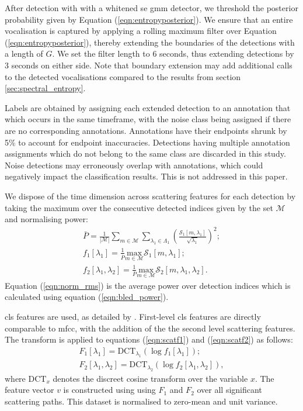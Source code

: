 {After detection with with a whitened \ac{se} \ac{gmm} detector, we threshold the posterior probability given by Equation (\ref{eqn:entropyposterior}). We ensure that an entire vocalisation is captured by applying a rolling maximum filter over Equation (\ref{eqn:entropyposterior}), thereby extending the boundaries of the detections with a length of $G$. We set the filter length to 6 seconds, thus extending detections by 3 seconds on either side. Note that boundary extension may add additional calls to the detected vocalisations compared to the results from section \ref{sec:spectral_entropy}.

Labels are obtained by assigning each extended detection to an annotation that which occurs in the same timeframe, with the noise class being assigned if there are no corresponding annotations. Annotations have their endpoints shrunk by 5\% to account for endpoint inaccuracies. Detections having multiple annotation assignments which do not belong to the same class are discarded in this study. Noise detections may erroneously overlap with annotations, which could negatively impact the classification results. This is not addressed in this paper.

We dispose of the time dimension across scattering features for each detection by taking the maximum over the consecutive detected indices given by the set $\mathcal{M}$ and normalising power:
\begin{gather}
    \label{eqn:norm_rms}
    \bar{P} = \frac{1}{\left| \mathcal{M} \right|}\sum_{m \in \mathcal{M}} \sum_{\lambda_1 \in \Lambda_1} \left(\frac{\mathcal{S}_1[m, \lambda_1]}{\sqrt{\lambda_1}}\right)^2; \\
    \label{eqn:scatf1}
    f_1[\lambda_1] = \frac{1}{\bar{P}}\underset{{m \in \mathcal{M}}}{\text{max}}\mathcal{S}_1[m, \lambda_1]; \\
    \label{eqn:scatf2}
    f_2[\lambda_1, \lambda_2] = \frac{1}{\bar{P}}\underset{{m \in \mathcal{M}}}{\text{max}} \mathcal{S}_2[m, \lambda_1, \lambda_2].    
\end{gather}
Equation (\ref{eqn:norm_rms}) is the average power over detection indices which is calculated using equation (\ref{eqn:bled_power}).

\Ac{cls} features are used, as detailed by \citet{ws_audio}. First-level \ac{cls} features are directly comparable to \ac{mfcc}, with the addition of the the second level scattering features. The transform is applied to equations (\ref{eqn:scatf1}) and (\ref{eqn:scatf2}) as follows:
\begin{gather}
    F_1[\lambda_1] = \text{DCT}_{\lambda_1}\left(\log f_1[\lambda_1]\right); \\
    F_2[\lambda_1, \lambda_2] = \text{DCT}_{\lambda_2}\left(\log f_2[\lambda_1, \lambda_2]\right),    
\end{gather}
where $\text{DCT}_{x}$ denotes the discreet cosine transform over the variable $x$. The feature vector $v$ is constructed using using $F_1$ and $F_2$ over all significant scattering paths. This dataset is normalised to zero-mean and unit variance.

}
